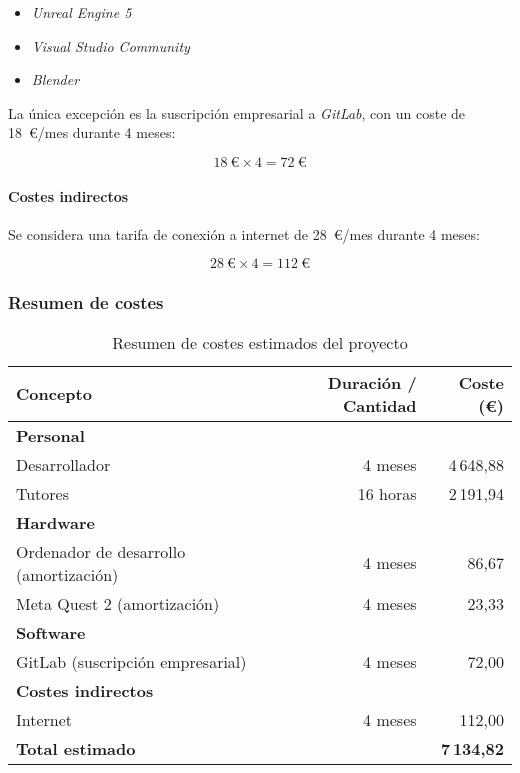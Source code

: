 \begin{itemize}
  \item \textit{Unreal Engine 5}
  \item \textit{Visual Studio Community}
  \item \textit{Blender}
\end{itemize}

La única excepción es la suscripción empresarial a \textit{GitLab}, con un coste de 18~€/mes durante 4 meses:

\[
18~\text{€} \times 4 = 72~\text{€}
\]

\paragraph{Costes indirectos}
Se considera una tarifa de conexión a internet de 28~€/mes durante 4 meses:

\[
28~\text{€} \times 4 = 112~\text{€}
\]

\subsubsection*{Resumen de costes}

\begin{table}[H]
  \centering
  \begin{tabularx}{\linewidth}{@{}Xrr@{}}
    \toprule
    \textbf{Concepto} & \textbf{Duración / Cantidad} & \textbf{Coste (€)} \\
    \midrule
    \textbf{Personal} & & \\
    Desarrollador & 4 meses & 4\,648{,}88 \\
    Tutores & 16 horas & 2\,191{,}94 \\
    \textbf{Hardware} & & \\
    Ordenador de desarrollo (amortización) & 4 meses & 86{,}67 \\
    Meta Quest 2 (amortización) & 4 meses & 23{,}33 \\
    \textbf{Software} & & \\
    GitLab (suscripción empresarial) & 4 meses & 72{,}00 \\
    \textbf{Costes indirectos} & & \\
    Internet & 4 meses & 112{,}00 \\
    \midrule
    \textbf{Total estimado} & & \textbf{7\,134{,}82} \\
    \bottomrule
  \end{tabularx}
  \caption{Resumen de costes estimados del proyecto}
  \label{tab:costes-finales}
\end{table}


